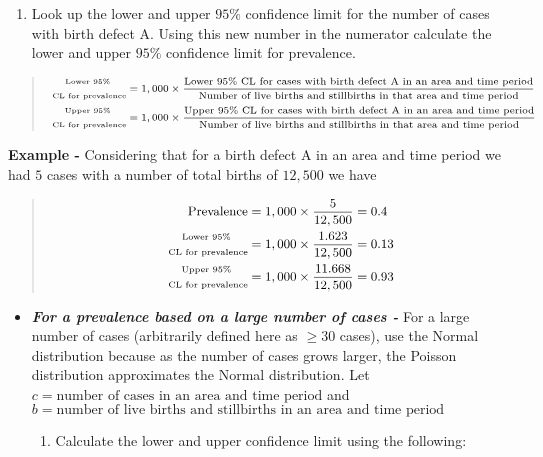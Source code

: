 \documentclass[
]{krantz}
\providecommand{\tightlist}{%
  \setlength{\itemsep}{0pt}\setlength{\parskip}{0pt}}
\begin{document}
\begin{enumerate}
\def\labelenumi{\arabic{enumi}.}
\setcounter{enumi}{1}
\tightlist
\item
  Look up the lower and upper \(95\%\) confidence limit for the number of cases with birth defect A. Using this new number in the numerator calculate the lower and upper \(95\%\) confidence limit for prevalence.
\end{enumerate}

\begin{quote}
\[
\scriptsize
\begin{aligned}
\substack{\text{Lower } 95\% \\ \\ \text{ CL for prevalence}} &= 1,000 \times \dfrac{\text{Lower } 95\% \text{ CL for cases with birth defect A in an area and time period}}{\text{Number of live births and stillbirths in that area and time period}}\\
\substack{\text{Upper } 95\% \\ \\ \text{ CL for prevalence}} &= 1,000 \times \dfrac{\text{Upper } 95\% \text{ CL for cases with birth defect A in an area and time period}}{\text{Number of live births and stillbirths in that area and time period}} 
\end{aligned}
\]
\end{quote}

\textbf{Example -} Considering that for a birth defect A in an area and time period we had \(5\) cases with a number of total births of \(12,500\) we have

\begin{quote}
\[
\small
\begin{aligned}
\text{Prevalence} &= 1,000 \times \dfrac{5}{12,500} = 0.4  \\
\substack{\text{Lower } 95\% \\ \\ \text{ CL for prevalence}} &= 1,000 \times \dfrac{1.623}{12,500} = 0.13 \\
\substack{\text{Upper } 95\% \\ \\\text{ CL for prevalence}} &= 1,000 \times \dfrac{11.668}{12,500} = 0.93 
\end{aligned}
\]
\end{quote}

\begin{itemize}
\item
  \textbf{\emph{For a prevalence based on a large number of cases -}} For a large number of cases (arbitrarily defined here as \(\ge 30\) cases), use the Normal distribution because as the number of cases grows larger, the Poisson distribution approximates the Normal distribution.
  Let \(c=\text{number of cases in an area and time period}\) and \(b=\text{number of live births and stillbirths in an area and time period}\)

  \begin{enumerate}
  \def\labelenumi{\arabic{enumi}.}
  \tightlist
  \item
    Calculate the lower and upper confidence limit using the following:
  \end{enumerate}
\end{itemize}
\end{document}
